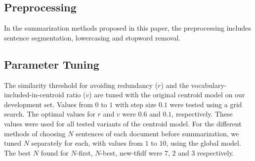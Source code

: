 \documentclass[11pt,letterpaper]{article}
\begin{document}
\subsection*{Preprocessing}
In the summarization methods proposed in this paper, the preprocessing includes sentence segmentation, lowercasing and stopword removal.
\subsection*{Parameter Tuning}
The similarity threshold for avoiding redundancy ($r$) and the vocabulary-included-in-centroid ratio ($v$) are tuned with the original centroid model on our development set. Values from $0$ to $1$ with step size $0.1$ were tested using a grid search. The optimal values for $r$ and $v$ were $0.6$ and $0.1$, respectively. These values were used for all tested variants of the centroid model. For the different methods of choosing $N$ sentences of each document before summarization, we tuned $N$ separately for each, with values from $1$ to $10$, using the global model. The best $N$ found for $N$-first, $N$-best, new-tfidf were 7, 2 and 3 respectively.  
\end{document}
